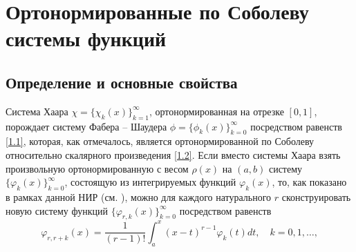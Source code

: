 \chapter{Ортонормированные по Соболеву системы функций }
\section{Определение и основные свойства}
Система Хаара $\chi=\{\chi_k(x)\}_{k=1}^\infty$, ортонормированная на отрезке $[0,1]$, порождает систему Фабера -- Шаудера $\phi=\{\phi_k(x)\}_{k=0}^\infty$ посредством равенств \eqref{1.1}, которая, как отмечалось, является ортонормированной по Соболеву относительно скалярного произведения \eqref{1.2}. Если вместо системы Хаара взять произвольную ортонормированную
с весом $\rho(x)$ на $(a,b)$  систему $\{\varphi_k(x)\}_{k=0}^\infty$, состоящую из интегрируемых функций $\varphi_k(x)$, то, как показано в рамках данной НИР (см. \cite{SharIzv2018}),  можно для каждого натурального $r$ сконструировать новую систему функций $\{\varphi_{r,k}(x)\}_{k=0}^\infty$ посредством равенств
\begin{equation}\label{2.1}
\varphi_{r,r+k}(x) =\frac{1}{(r-1)!}\int_a^x(x-t)^{r-1}\varphi_{k}(t)dt, \quad k=0,1,\ldots,
\end{equation}

